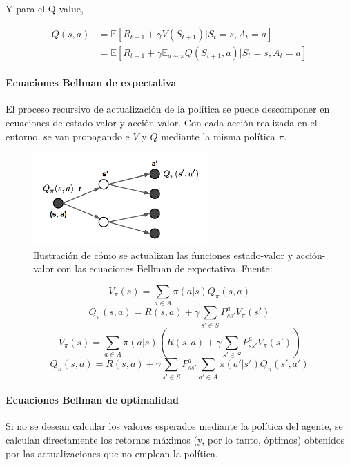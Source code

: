 Y para el Q-value, 

\begin{equation*}
\begin{split}
   Q(s, a) & = \mathbb{E}[R_{t+1} + \gamma V(S_{t+1})|S_t = s, A_t = a] \\
   & = \mathbb{E}[R_{t+1} + \gamma \mathbb{E}_{a\sim \pi}Q(S_{t+1}, a)|S_t = s, A_t = a]
\end{split}
\end{equation*}

\paragraph{Ecuaciones Bellman de expectativa}
El proceso recursivo de actualización de la política se puede descomponer en ecuaciones de estado-valor y acción-valor. Con cada acción realizada en el entorno, se van propagando e $V$ y $Q$ mediante la misma política $\pi$.

\begin{figure}[h]
    \centering
    \includegraphics[width=0.6\textwidth]{cap2_contextualizacion/images/bellman_equation_expectation.png}
    \caption{Ilustración de cómo se actualizan las funciones estado-valor y acción-valor con las ecuaciones Bellman de expectativa. Fuente: \cite{lilLogRL}}
    \label{fig:bellman_equation_expectation}
\end{figure}

\[V_\pi(s)=\sum_{a \in A} \pi(a|s)Q_\pi(s,a)\]
\[Q_\pi(s,a) = R(s, a) + \gamma \sum_{s' \in S} P_{ss'}^a V_\pi(s')\]
\[V_\pi(s)=\sum_{a \in A} \pi(a|s)(R(s, a) + \gamma \sum_{s' \in S} P_{ss'}^a V_\pi(s'))\]
\[Q_\pi(s,a) = R(s, a) + \gamma \sum_{s' \in S} P_{ss'}^a \sum_{a' \in A} \pi(a'|s')Q_\pi(s',a')\]

\paragraph{Ecuaciones Bellman de optimalidad}

Si no se desean calcular los valores esperados mediante la política del agente, se calculan directamente los retornos máximos (y, por lo tanto, óptimos) obtenidos por las actualizaciones que no emplean la política. 

